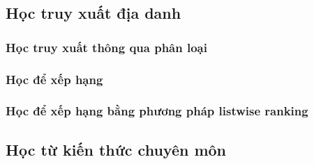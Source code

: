\subsection{Học truy xuất địa danh}

\subsubsection{Học truy xuất thông qua phân loại}

\subsubsection{Học để xếp hạng}

\subsubsection{Học để xếp hạng bằng phương pháp listwise ranking}

\subsection{Học từ kiến thức chuyên môn}
